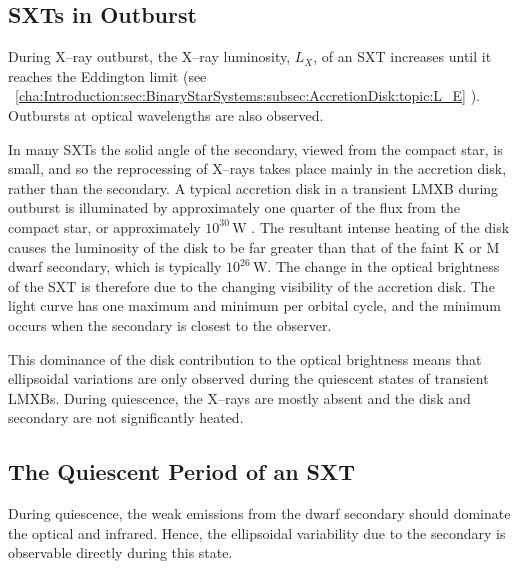
\subsection{SXTs in Outburst}\label{cha:Introduction:sec:X--rayBinaries:subsec:Outburst}

During X--ray outburst, the X--ray luminosity, $L_X$, of an SXT increases until it reaches
the Eddington limit (see%
\ \vref{cha:Introduction:sec:BinaryStarSystems:subsec:AccretionDisk:topic:L_E}%
). Outbursts at optical wavelengths are also observed.%

\vspace{\myparskip}

In many SXTs the solid angle of the secondary, viewed from the compact star, is small, and so the reprocessing
of X--rays takes place mainly in the accretion disk, rather than the secondary. A typical accretion disk in a transient LMXB during outburst is illuminated by approximately one quarter of the
flux from the compact star, or approximately
$10^{30}\,\mathrm{W}$ %
\cite{VanParadijsMcClintock:1995}. %
The resultant intense heating of the disk causes the luminosity of the
disk to be far greater than that of the faint K or M dwarf secondary,
which is typically $10^{26}\,\mathrm{W}$. %
The change in the optical brightness of the SXT is therefore due to the changing
visibility of the accretion disk. The light curve has one maximum and minimum per orbital
cycle, and the minimum occurs when the secondary is closest to the
observer. %

\vspace{\myparskip}

This dominance of the disk contribution to the optical brightness means
that ellipsoidal variations are only observed during the quiescent
states of transient LMXBs. During
quiescence, the X--rays are mostly absent and the disk and secondary are not
significantly heated. %


\subsection{The Quiescent Period of an SXT}\label{cha:Introduction:sec:X--rayBinaries:subsec:Quiescence}

During quiescence, the weak emissions from the dwarf secondary should dominate the optical and
infrared. Hence, the ellipsoidal variability due to the secondary is
observable directly during this state. %

